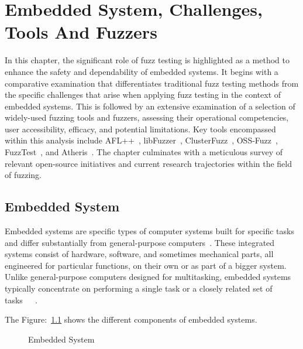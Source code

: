 \vspace{21.5pt}
\chapter{Embedded System, Challenges, Tools And Fuzzers}\label{sec:embedded_system}
In this chapter, the significant role of fuzz testing is highlighted as a method
to enhance the safety and dependability of embedded systems. It begins with a
comparative examination that differentiates traditional fuzz testing methods
from the specific challenges that arise when applying fuzz testing in the
context of embedded systems. This is followed by an extensive
examination of a selection of widely-used fuzzing tools and fuzzers,
assessing their operational competencies, user accessibility, efficacy, and
potential limitations. Key tools encompassed within this analysis include
AFL++~\cite{257204}, libFuzzer~\cite{libFuzze17:online}, ClusterFuzz~\cite{ClusterF90:online},
OSS-Fuzz~\cite{GitHubgo49:online}, FuzzTest~\cite{GitHubgo59:online}, and Atheris~\cite{atheris2020}. The chapter culminates with a meticulous
survey of relevant open-source initiatives and current research trajectories
within the field of fuzzing.

\section{Embedded System}
Embedded systems are specific types of computer systems built for specific tasks and
differ substantially from general-purpose computers~\cite{Top10Bes48:online}.
These integrated systems
consist of hardware, software, and sometimes mechanical parts, all engineered
for particular functions, on their own or as part of a bigger system.
Unlike general-purpose computers designed for multitasking, embedded systems
typically concentrate on performing a single task or a closely related set of
tasks~\cite{marwedel2021embedded}~\cite{yun2022fuzzing}~\cite{Introduc26:online}.

The Figure:~\ref{fig:Embedded_System} shows the different components of embedded systems.

\begin{figure}[h]
        \centering
        {}
        \caption{Embedded System~\cite{Introduc82:online}}\label{fig:Embedded_System}
\end{figure}

